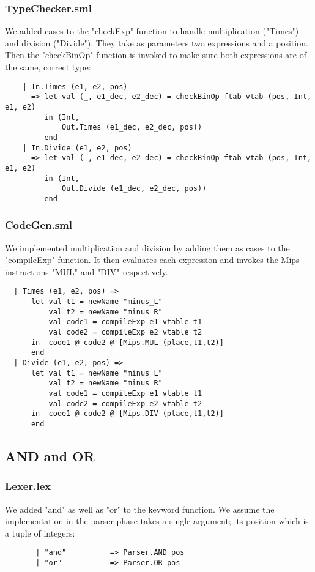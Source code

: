 \documentclass[12pt]{article}
\begin{document}
\subsubsection{TypeChecker.sml}
We added cases to the "checkExp" function to handle multiplication ("Times") and division ("Divide"). They take as parameters two expressions and a position. Then the "checkBinOp" function is invoked to make sure both expressions are of the same, correct type:
\begin{verbatim}
    | In.Times (e1, e2, pos)
      => let val (_, e1_dec, e2_dec) = checkBinOp ftab vtab (pos, Int, e1, e2)
         in (Int,
             Out.Times (e1_dec, e2_dec, pos))
         end
    | In.Divide (e1, e2, pos)
      => let val (_, e1_dec, e2_dec) = checkBinOp ftab vtab (pos, Int, e1, e2)
         in (Int,
             Out.Divide (e1_dec, e2_dec, pos))
         end
\end{verbatim}
\subsubsection{CodeGen.sml}
We implemented multiplication and division by adding them as cases to the "compileExp" function. It then evaluates each expression and invokes the Mips instructions "MUL" and "DIV" respectively. 
\begin{verbatim}
  | Times (e1, e2, pos) =>
      let val t1 = newName "minus_L"
          val t2 = newName "minus_R"
          val code1 = compileExp e1 vtable t1
          val code2 = compileExp e2 vtable t2
      in  code1 @ code2 @ [Mips.MUL (place,t1,t2)]
      end
  | Divide (e1, e2, pos) =>
      let val t1 = newName "minus_L"
          val t2 = newName "minus_R"
          val code1 = compileExp e1 vtable t1
          val code2 = compileExp e2 vtable t2
      in  code1 @ code2 @ [Mips.DIV (place,t1,t2)]
      end
\end{verbatim}
\clearpage
\subsection{AND and OR}
\subsubsection{Lexer.lex}
We added "and" as well as "or" to the keyword function. We assume the implementation in the parser phase takes a single argument; its position which is a tuple of integers:
\begin{verbatim}
       | "and"          => Parser.AND pos
       | "or"           => Parser.OR pos
\end{verbatim}
\end{document}

